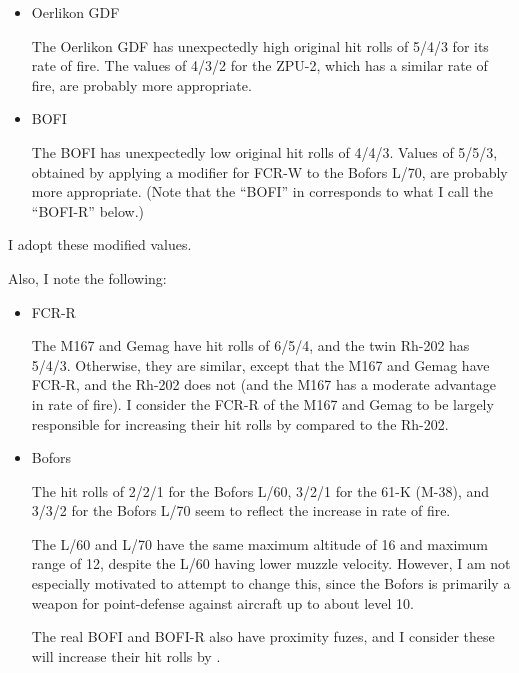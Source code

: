 {\begin{itemize}
            The twin has an unexpectedly low original damage rating of 2 for its rate of fire. A value of 3, increased by one from the baseline for the caliber, is probably more appropriate.

        \item Oerlikon GDF

            The Oerlikon GDF has unexpectedly high original hit rolls of 5/4/3 for its rate of fire. The values of 4/3/2 for the ZPU-2, which has a similar rate of fire, are probably more appropriate.

        \item BOFI

            The BOFI has unexpectedly low original hit rolls of 4/4/3. Values of 5/5/3, obtained by applying a  modifier for FCR-W to the Bofors L/70, are probably more appropriate. (Note that the “BOFI” in {\AirStr} corresponds to what I call the “BOFI-R” below.)

    \end{itemize}

    I adopt these modified values.

    Also, I note the following:

    \begin{itemize}

        \item FCR-R

            The M167 and Gemag have hit rolls of 6/5/4, and the twin Rh-202 has 5/4/3. Otherwise, they are similar, except that the M167 and Gemag have FCR-R, and the Rh-202 does not (and the M167 has a moderate advantage in rate of fire). I consider the FCR-R of the M167 and Gemag to be largely responsible for increasing their hit rolls by  compared to the Rh-202.

        \item Bofors

            The hit rolls of 2/2/1 for the Bofors L/60, 3/2/1 for the 61-K (M-38), and 3/3/2 for the Bofors L/70 seem to reflect the increase in rate of fire.

            The L/60 and L/70 have the same maximum altitude of 16 and maximum range of 12, despite the L/60 having lower muzzle velocity. However, I am not especially motivated to attempt to change this, since the Bofors is primarily a weapon for point-defense against aircraft up to about level 10.

            The real BOFI and BOFI-R also have proximity fuzes, and I consider these will increase their hit rolls by .


\end{itemize}}
